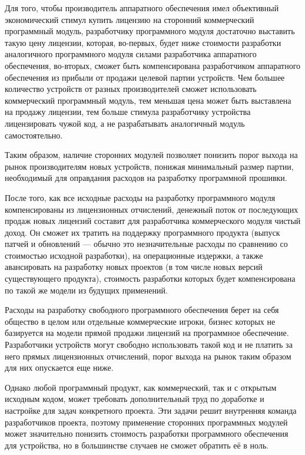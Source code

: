\documentclass{article}
\begin{document}
Для того, чтобы производитель аппаратного обеспечения имел объективный экономический стимул купить лицензию на сторонний коммерческий программный модуль, разработчику программного модуля достаточно выставить такую цену лицензии, которая, во-первых, будет ниже стоимости разработки аналогичного программного модуля силами разработчика аппаратного обеспечения, во-вторых, сможет быть компенсирована разработчиком аппаратного обеспечения из прибыли от продажи целевой партии устройств. Чем большее количество устройств от разных производителей сможет использовать коммерческий программный модуль, тем меньшая цена может быть выставлена на продажу лицензии, тем больше стимула разработчику устройства лицензировать чужой код, а не разрабатывать аналогичный модуль самостоятельно.

Таким образом, наличие сторонних модулей позволяет понизить порог выхода на рынок производителям новых устройств, понижая минимальный размер партии, необходимый для оправдания расходов на разработку программной прошивки.

После того, как все исходные расходы на разработку программного модуля компенсированы из лицензионных отчислений, денежный поток от последующих продаж новых лицензий составит для разработчика коммерческого модуля чистый доход. Он сможет их тратить на поддержку программного продукта (выпуск патчей и обновлений — обычно это незначительные расходы по сравнению со стоимостью исходной разработки), на операционные издержки, а также авансировать на разработку новых проектов (в том числе новых версий существующего продукта), стоимость разработки которых будет компенсирована по такой же модели из будущих применений.

Расходы на разработку свободного программного обеспечения берет на себя общество в целом или отдельные коммерческие игроки, бизнес которых не базируется на модели прямой продажи лицензий на программное обеспечение. Разработчики устройств могут свободно использовать такой код и не платить за него прямых лицензионных отчислений, порог выхода на рынок таким образом для них опускается еще ниже.

Однако любой программный продукт, как коммерческий, так и с открытым исходным кодом, может требовать дополнительный труд по доработке и настройке для задач конкретного проекта. Эти задачи решит внутренняя команда разработчиков проекта, поэтому применение сторонних программных модулей может значительно понизить стоимость разработки программного обеспечения для устройства, но в большинстве случаев не сможет обратить её в ноль.
\end{document}
